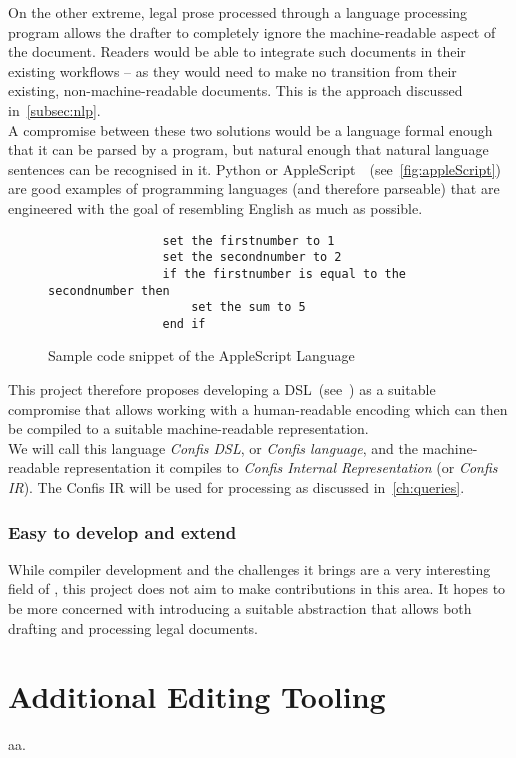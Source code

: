 On the other extreme, legal prose processed through a language processing program allows the drafter to completely ignore the machine-readable aspect of the document.
Readers would be able to integrate such documents in their existing workflows -- as they would need to make no transition from their existing, non-machine-readable documents.
This is the approach discussed in~\autoref{subsec:nlp}.\\

A compromise between these two solutions would be a language formal enough that it can be parsed by a program, but natural enough that natural language sentences can be recognised in it.
Python or AppleScript~\cite{Sanderson2010appleScript}~(see~\autoref{fig:appleScript}) are good examples of programming languages (and therefore parseable) that are engineered with the goal of resembling English as much as possible.

\begin{figure}[h]
    \centering
    \begin{verbatim}
                set the firstnumber to 1
                set the secondnumber to 2
                if the firstnumber is equal to the secondnumber then
                    set the sum to 5
                end if
    \end{verbatim}
    \caption{Sample code snippet of the AppleScript Language~\cite{Sanderson2010appleScript}}
    \label{fig:appleScript}
\end{figure}

This project therefore proposes developing a DSL~(see~) as a suitable compromise that allows working with a human-readable encoding which can then be compiled to a suitable machine-readable representation.\\

We will call this language \emph{Confis DSL}, or \emph{Confis language}, and the machine-readable representation it compiles to \emph{Confis Internal Representation} (or \emph{Confis IR}).
The Confis IR will be used for processing as discussed in~\autoref{ch:queries}.

\subsubsection{Easy to develop and extend}

While compiler development and the challenges it brings are a very interesting field of \subjectname, this project does not aim to make contributions in this area.
It hopes to be more concerned with introducing a suitable abstraction that allows both drafting and processing legal documents.


\section{Additional Editing Tooling}\label{sec:additional-dsl-tooling}

aa.
